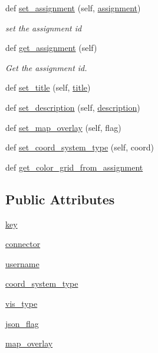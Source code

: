 \begin{DoxyCompactItemize}
def \mbox{\hyperlink{class_bridges_1_1bridges_1_1_bridges_a7a8e13b7b0908c9d0bce26c5ad41c32e}{set\+\_\+assignment}} (self, \mbox{\hyperlink{class_bridges_1_1bridges_1_1_bridges_a66e278ddefd9a2c94c01eb0fc9bbc568}{assignment}})
\begin{DoxyCompactList}\small\item\em set the assignment id \end{DoxyCompactList}\item 
def \mbox{\hyperlink{class_bridges_1_1bridges_1_1_bridges_ac65a74c86b8b2e456f43cf731daae085}{get\+\_\+assignment}} (self)
\begin{DoxyCompactList}\small\item\em Get the assignment id. \end{DoxyCompactList}\item 
def \mbox{\hyperlink{class_bridges_1_1bridges_1_1_bridges_a1732ccf3904c3de48f697feff32b95a5}{set\+\_\+title}} (self, \mbox{\hyperlink{class_bridges_1_1bridges_1_1_bridges_a5427643899fb1ddfc7d4d834779409bd}{title}})
\item 
def \mbox{\hyperlink{class_bridges_1_1bridges_1_1_bridges_aa9af47e59998f5d9659c4d49295c6ece}{set\+\_\+description}} (self, \mbox{\hyperlink{class_bridges_1_1bridges_1_1_bridges_adf7716495f589eef1236200869f22679}{description}})
\item 
def \mbox{\hyperlink{class_bridges_1_1bridges_1_1_bridges_ae051d3b37125d0806f15a0990df5885c}{set\+\_\+map\+\_\+overlay}} (self, flag)
\item 
def \mbox{\hyperlink{class_bridges_1_1bridges_1_1_bridges_a6e70886184cb4735961507d9e84eb8fe}{set\+\_\+coord\+\_\+system\+\_\+type}} (self, coord)
\item 
def \mbox{\hyperlink{class_bridges_1_1bridges_1_1_bridges_a88c1a0909a08065f31c5d0868e9d1900}{get\+\_\+color\+\_\+grid\+\_\+from\+\_\+assignment}}
\end{DoxyCompactItemize}
\subsection*{Public Attributes}
\begin{DoxyCompactItemize}
\item 
\mbox{\hyperlink{class_bridges_1_1bridges_1_1_bridges_a0ec63234eea5146e87f0572972a7f41d}{key}}
\item 
\mbox{\hyperlink{class_bridges_1_1bridges_1_1_bridges_a178b38dd8e06bcd4e57527301454ba12}{connector}}
\item 
\mbox{\hyperlink{class_bridges_1_1bridges_1_1_bridges_afe26b5521aae689055377e6f2e6a7212}{username}}
\item 
\mbox{\hyperlink{class_bridges_1_1bridges_1_1_bridges_ae5c5349721fdc457fcae13ed370ba1d8}{coord\+\_\+system\+\_\+type}}
\item 
\mbox{\hyperlink{class_bridges_1_1bridges_1_1_bridges_a0c3729b756ec663959e99210d986638e}{vis\+\_\+type}}
\item 
\mbox{\hyperlink{class_bridges_1_1bridges_1_1_bridges_a93088231d5f240848046e8065330aa4f}{json\+\_\+flag}}
\item 
\mbox{\hyperlink{class_bridges_1_1bridges_1_1_bridges_a925840aac84da0d17db238e5628d5f1a}{map\+\_\+overlay}}
\end{DoxyCompactItemize}
